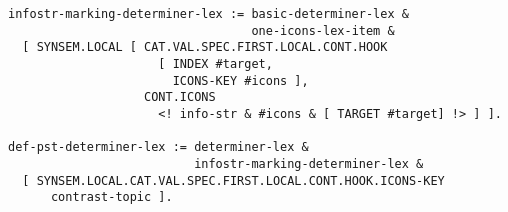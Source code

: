 \documentclass[a4paper]{article}
\begin{document}
{\small\begin{verbatim}
infostr-marking-determiner-lex := basic-determiner-lex &
                                  one-icons-lex-item & 
  [ SYNSEM.LOCAL [ CAT.VAL.SPEC.FIRST.LOCAL.CONT.HOOK
                     [ INDEX #target,
                       ICONS-KEY #icons ],
                   CONT.ICONS 
                     <! info-str & #icons & [ TARGET #target] !> ] ].

def-pst-determiner-lex := determiner-lex & 
                          infostr-marking-determiner-lex &
  [ SYNSEM.LOCAL.CAT.VAL.SPEC.FIRST.LOCAL.CONT.HOOK.ICONS-KEY 
      contrast-topic ].
\end{verbatim}}
\end{document}
